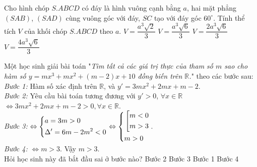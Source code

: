 \begin{ex}%
Cho hình chóp $S.ABCD$ có đáy là hình vuông cạnh bằng $a$, hai mặt phẳng $(SAB)$, $(SAD)$ cùng vuông góc với đáy, $SC$ tạo với đáy góc $60^\circ$. Tính thể tích $V$ của khối chóp $S.ABCD$ theo $a$. 
\choice
{$V = \dfrac{a^3\sqrt{2}}{3}$}
{\True $V = \dfrac{a^3\sqrt{6}}{3}$}
{$V = \dfrac{2a^3\sqrt{6}}{3}$}
{$V = \dfrac{4a^3\sqrt{6}}{3}$}
\end{ex}

\begin{ex}%
Một học sinh giải bài toán "\textit{Tìm tất cả các giá trị thực của tham số $m$ sao cho hàm số $y = mx^3 + mx^2 + (m - 2)x + 10$ đồng biến trên $\mathbb{R}$.}" theo các bước sau:\\
\textit{Bước 1:} Hàm số xác định trên $\mathbb{R}$, và $y' = 3mx^2 + 2mx + m - 2$.\\
\textit{Bước 2:} Yêu cầu bài toán tương đương với $y' > 0$, $\forall x \in \mathbb{R}$ $\Leftrightarrow 3mx^2 + 2mx + m - 2 > 0, \forall x \in \mathbb{R}$.\\
\textit{Bước 3:} $\Leftrightarrow \left\{\begin{aligned}&a = 3m > 0\\ &\Delta ' = 6m - 2m^2 < 0\end{aligned}\right. \Leftrightarrow \left\{\begin{aligned}&\left[\begin{aligned}&m < 0\\ &m > 3\end{aligned}\right.\\ &m > 0\end{aligned}\right.$.\\
\textit{Bước 4:} $\Leftrightarrow m > 3$. Vậy $m > 3$.\\
Hỏi học sinh này đã bắt đầu sai ở bước nào?
\choice
{Bước 2}
{\True Bước 3}
{Bước 1}
{Bước 4}
\end{ex}

